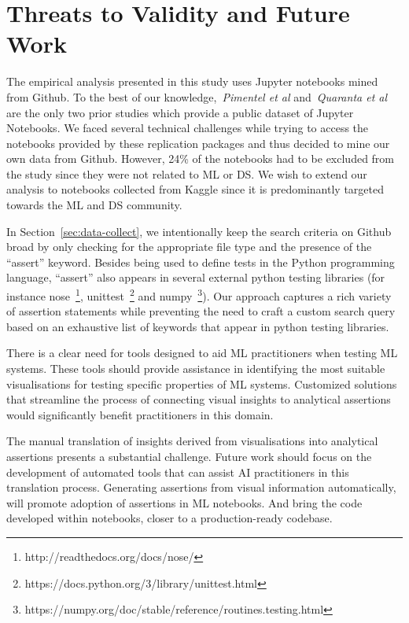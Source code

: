 \documentclass[conference]{IEEEtran}
\begin{document}
\section{Threats to Validity and Future Work}\label{sec:threats}

The empirical analysis presented in this study uses Jupyter notebooks mined from Github. To the best of our knowledge,~\emph{Pimentel et al} and~\emph{Quaranta et al} are the only two prior studies which provide a public dataset of Jupyter Notebooks. We faced several technical challenges while trying to access the notebooks provided by these replication packages and thus decided to mine our own data from Github. However, 24\% of the notebooks had to be excluded from the study since they were not related to ML or DS. We wish to extend our analysis to notebooks collected from Kaggle since it is predominantly targeted towards the ML and DS community.

In Section~\ref{sec:data-collect}, we intentionally keep the search criteria on Github broad by only checking for the appropriate file type and the presence of the ``assert'' keyword. Besides being used to define tests in the Python programming language, ``assert'' also appears in several external python testing libraries (for instance nose~\footnote{http://readthedocs.org/docs/nose/}, unittest~\footnote{https://docs.python.org/3/library/unittest.html} and numpy~\footnote{https://numpy.org/doc/stable/reference/routines.testing.html}). Our approach captures a rich variety of assertion statements while preventing the need to craft a custom search query based on an exhaustive list of keywords that appear in python testing libraries.

There is a clear need for tools designed to aid ML practitioners when testing ML systems. These tools should provide assistance in identifying the most suitable visualisations for testing specific properties of ML systems. Customized solutions that streamline the process of connecting visual insights to analytical assertions would significantly benefit practitioners in this domain.

The manual translation of insights derived from visualisations into analytical assertions presents a substantial challenge. Future work should focus on the development of automated tools that can assist AI practitioners in this translation process. Generating assertions from visual information automatically, will promote adoption of assertions in ML notebooks. And bring the code developed within notebooks, closer to a production-ready codebase.
\end{document}
